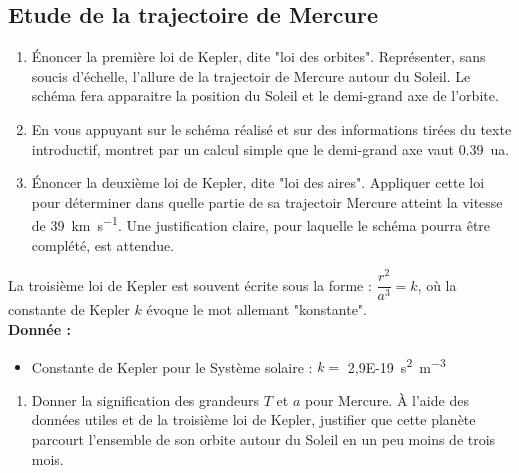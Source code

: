 \documentclass[a4paper,11pt,fleqn]{article}%
\begin{document}
\subsection{Etude de la trajectoire de Mercure}
\begin{enumerate}
    \item Énoncer la première loi de Kepler, dite "loi des orbites". Représenter, sans soucis d'échelle, l'allure de la trajectoir de Mercure autour du Soleil. Le schéma fera apparaitre la position du Soleil et le demi-grand axe de l'orbite.
    \item En vous appuyant sur le schéma réalisé et sur des informations tirées du texte introductif, montret par un calcul simple que le demi-grand axe vaut \SI{0,39}{ua}.
    \item Énoncer la deuxième loi de Kepler, dite "loi des aires". Appliquer cette loi pour déterminer dans quelle partie de sa trajectoir Mercure atteint la vitesse de \SI{39}{\kilo\meter\per\second}. Une justification claire, pour laquelle le schéma pourra être complété, est attendue.
\end{enumerate}
La troisième loi de Kepler est souvent écrite sous la forme : $\dfrac{r^2}{a^3} =k$, où la constante de Kepler $k$ évoque le mot allemant "konstante".\\
\textbf{Donnée :}
\begin{itemize}
    \item Constante de Kepler pour le Système solaire : $k =$ \SI{2,9E-19}{\second\squared\per\meter\cubed}
\end{itemize}
\begin{enumerate}[resume]
    \item Donner la signification des grandeurs $T$ et $a$ pour Mercure. À l'aide des données utiles et de la troisième loi de Kepler, justifier que cette planète parcourt l'ensemble de son orbite autour du Soleil en un peu moins de trois mois.
\end{enumerate}
\end{document}
